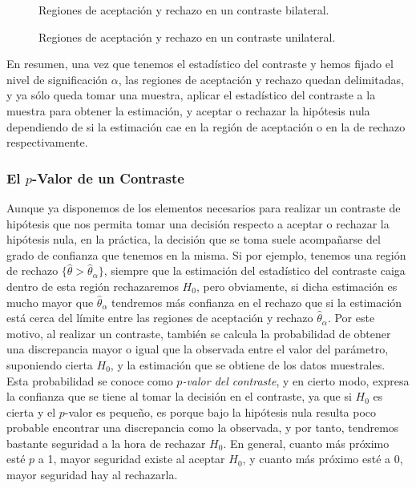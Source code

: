 \begin{figure}[h!]
\begin{center}
\scalebox{0.8}{}
\caption{Regiones de aceptación y rechazo en un contraste
bilateral.}\label{g:regiones_contraste_bilateral}
\end{center}
\end{figure}

\begin{figure}[h!]
\begin{center}
\scalebox{0.8}{}
\caption{Regiones de aceptación y rechazo en un contraste
unilateral.}\label{g:regiones_contraste_unilateral}
\end{center}
\end{figure}

En resumen, una vez que tenemos el estadístico del contraste y hemos fijado el nivel de significación $\alpha$, las
regiones de aceptación y rechazo quedan delimitadas, y ya sólo queda tomar una muestra, aplicar el estadístico del
contraste a la muestra para obtener la estimación, y aceptar o rechazar la hipótesis nula dependiendo de si la
estimación cae en la región de aceptación o en la de rechazo respectivamente.


\subsubsection{El $p$-Valor de un Contraste}
Aunque ya disponemos de los elementos necesarios para realizar un contraste de hipótesis que nos permita tomar una
decisión respecto a aceptar o rechazar la hipótesis nula, en la práctica, la decisión que se toma suele acompañarse del
grado de confianza que tenemos en la misma.
Si por ejemplo, tenemos una región de rechazo $\{\hat{\theta}>\hat{\theta}_\alpha\}$, siempre que la estimación del
estadístico del contraste caiga dentro de esta región rechazaremos $H_0$, pero obviamente, si dicha estimación es mucho
mayor que $\hat{\theta}_\alpha$ tendremos más confianza en el rechazo que si la estimación está cerca del límite entre
las regiones de aceptación y rechazo $\hat{\theta}_\alpha$.
Por este motivo, al realizar un contraste, también se calcula la probabilidad de obtener una discrepancia mayor o igual
que la observada entre el valor del parámetro, suponiendo cierta $H_0$, y la estimación que se obtiene de los datos
muestrales.
Esta probabilidad se conoce como  \emph{$p$-valor del contraste}, y en cierto modo, expresa la confianza que se tiene al
tomar la decisión en el contraste, ya que si $H_0$ es cierta y el $p$-valor es pequeño, es porque bajo la hipótesis nula
resulta poco probable encontrar una discrepancia como la observada, y por tanto, tendremos bastante seguridad a la hora
de rechazar $H_0$.
En general, cuanto más próximo esté $p$ a 1, mayor seguridad existe al aceptar $H_0$, y cuanto más próximo esté a 0,
mayor seguridad hay al rechazarla.

